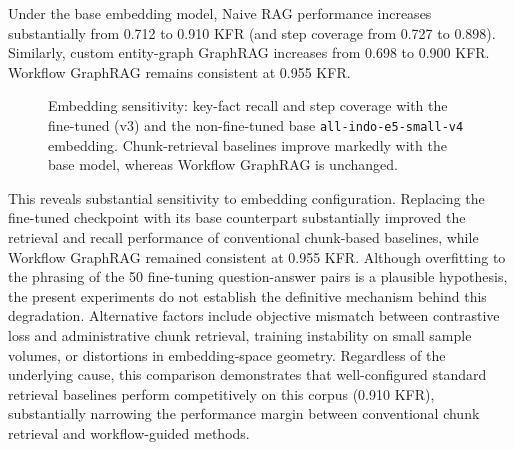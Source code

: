 \documentclass[preprint,10pt]{elsarticle}
\begin{document}
Under the base embedding model, Naive RAG performance increases substantially from 0.712 to 0.910 KFR (and step coverage from 0.727 to 0.898). Similarly, custom entity-graph GraphRAG increases from 0.698 to 0.900 KFR. Workflow GraphRAG remains consistent at 0.955 KFR.
\begin{figure}[!htbp]
\centering
{}
\caption{Embedding sensitivity: key-fact recall and step coverage with the fine-tuned (v3) and the non-fine-tuned base \texttt{all-indo-e5-small-v4} embedding. Chunk-retrieval baselines improve markedly with the base model, whereas Workflow GraphRAG is unchanged.}
\label{fig:embedding}
\end{figure}

This reveals substantial sensitivity to embedding configuration. Replacing the fine-tuned checkpoint with its base counterpart substantially improved the retrieval and recall performance of conventional chunk-based baselines, while Workflow GraphRAG remained consistent at 0.955 KFR. Although overfitting to the phrasing of the 50 fine-tuning question-answer pairs is a plausible hypothesis, the present experiments do not establish the definitive mechanism behind this degradation. Alternative factors include objective mismatch between contrastive loss and administrative chunk retrieval, training instability on small sample volumes, or distortions in embedding-space geometry. Regardless of the underlying cause, this comparison demonstrates that well-configured standard retrieval baselines perform competitively on this corpus (0.910 KFR), substantially narrowing the performance margin between conventional chunk retrieval and workflow-guided methods.
\end{document}
